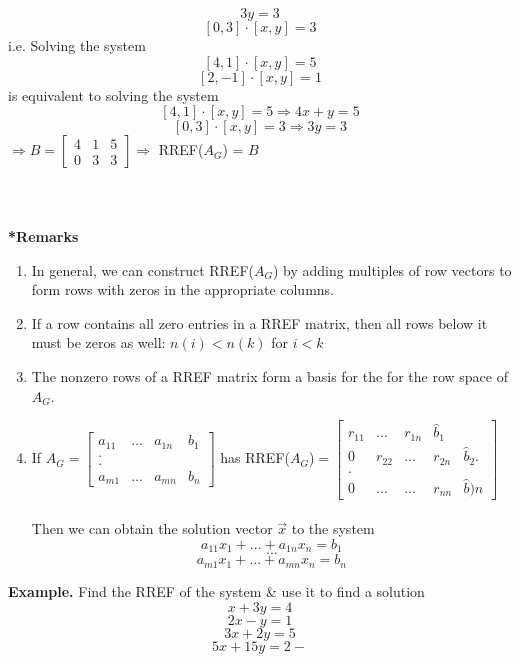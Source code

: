 \documentclass [12pt]{article}
\begin{document}
\[3y=3\]
\[[0,3]\cdot[x,y]=3\]
i.e. Solving the system 
\[[4,1]\cdot[x,y]=5\]
\[[2,-1]\cdot[x,y]=1\]
is equivalent to solving the system 
\[[4,1]\cdot[x,y]=5\Rightarrow 4x+y=5\]
\[[0,3]\cdot[x,y]=3\Rightarrow 3y=3\]
$\Rightarrow B=\begin{bmatrix}
4&1&5\\
0&3&3
\end{bmatrix}\Rightarrow$ RREF($A_G$) = $B$\\\\\\\\
\noindent\textbf{*Remarks}
\begin{enumerate}[\quad(i)]
    \item In general, we can construct RREF($A_G$) by adding multiples of row vectors to form rows with zeros in the appropriate columns.
    \item If a row contains all zero entries in a RREF matrix, then all rows below it must be zeros as well: $n(i)<n(k)$ for $i<k$
    \item The nonzero rows of a RREF matrix form a basis for the for the row space of $A_G$.
    \item If $A_G=\begin{bmatrix}
    a_{11}&...&a_{1n}&b_1\\
    .\\
    .\\
    a_{m1}&...&a_{mn}&b_n
    \end{bmatrix}$ has RREF($A_G$)$=\begin{bmatrix}
    r_{11}&...&r_{1n}&\hat{b}_1\\
    0&r_{22}&...&r_{2n}&\hat{b}_2
    .\\
    .\\
    0&...&...&r_{nn}&\hat{b})n
    \end{bmatrix}$\\\\
    Then we can  obtain the solution vector $\overrightarrow{x}$ to the system
    \[a_{11}x_1+...+a_{1n}x_n=b_1\]
    \[...\]
    \[a_{m1}x_1+...+a_{mn}x_n=b_n\]
\end{enumerate}
\noindent\textbf{Example. }Find the RREF of the system \& use it to find a solution
\[x+3y=4\]
\[2x-y=1\]
\[3x+2y=5\]
\[5x+15y=2-\]
\\\\
\end{document}
